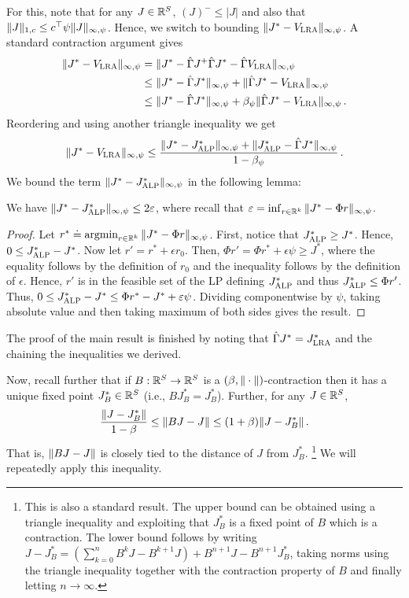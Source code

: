 \documentclass[twocolumn]{IEEEtran}
\begin{document}
For this, note that for any $J\in \mathbb{R}^S$,
$(J)^-\le |J|$
and also that $\|J\|_{1,c} \le c^\top \psi \| J \|_{\infty,\psi}$. Hence, we switch to bounding
$\|J^* - V_{\text{\sc LRA}} \|_{\infty,\psi}$.
A standard contraction argument gives
\begin{align*}
\|J^* - V_{\text{\sc LRA}} \|_{\infty,\psi}
& =   \| J^* - \hat{\Gamma} J^ + \hat{\Gamma} J^* -\hat{\Gamma} V_{\text{\sc LRA}} \|_{\infty,\psi} \\
& \le \| J^* - \hat{\Gamma} J^*\|_{\infty,\psi} + \|\hat{\Gamma} J^* - V_{\text{\sc LRA}} \|_{\infty,\psi} \\
& \le \| J^* - \hat{\Gamma} J^*\|_{\infty,\psi} + \beta_\psi \|\hat{\Gamma} J^* - V_{\text{\sc LRA}} \|_{\infty,\psi}\,.
\end{align*}
Reordering and using another triangle inequality we get
\begin{align*}
\|J^* - V_{\text{\sc LRA}} \|_{\infty,\psi} \le \frac{
\|J^* - J^*_{\text{\sc ALP}}\|_{\infty,\psi} + \| J^*_{\text{\sc ALP}} - \hat{\Gamma} J^* \|_{\infty,\psi}
}{1-\beta_\psi}\,.
\end{align*}
We bound the term $\|J^* - J^*_{\text{\sc ALP}}\|_{\infty,\psi}$ in the following lemma:
\begin{lemma}\label{bestbndmn}
We have
$ %
\norm{J^*-\Jalpo}_{\mn}\leq 2 \epsilon
$, %
where recall that $\varepsilon = \inf_{r\in \mathbb{R}^k} \| J^*-\Phi r \|_{\infty,\psi}$.
\end{lemma}
\begin{proof}
Let $r^*\doteq \operatorname{argmin}_{r\in \mathbb{R}^k} \| J^*-\Phi r \|_{\infty,\psi}$.
First, notice that $J^*_{\text{\sc ALP}} \ge J^*$.
Hence, $0\le J^*_{\text{\sc ALP}} - J^*$.
Now let $r' = r^* + \epsilon r_0$. Then,
$\Phi r' = \Phi r^* + \epsilon \psi \ge J^*$, where the equality follows by the definition of $r_0$ and
the inequality follows by the definition of $\epsilon$.
Hence, $r'$ is in the feasible set of the LP defining $J^*_{\text{\sc ALP}}$ and thus $J^*_{\text{\sc ALP}} \le \Phi r'$.
Thus, $0\le J^*_{\text{\sc ALP}} - J^* \le \Phi r^* - J^* + \varepsilon \psi$. Dividing componentwise by $\psi$,
taking absolute value and then taking maximum of both sides gives the result.
\end{proof}
The proof of the main result is finished by noting that $\hat{\Gamma} J^* = J^*_{\text{\sc LRA}}$ and the chaining the inequalities we derived.

Now, recall further that if $B:\mathbb{R}^S \to \mathbb{R}^S$ is a $(\beta,\|\cdot\|)$-contraction then it has a unique fixed point $J^*_B\in \mathbb{R}^S$ (i.e., $B J^*_B= J^*_B$). Further, for any $J\in \mathbb{R}^S$,
\begin{align}
\label{eq:csdw}
\frac{\norm{J-J^*_B}}{1-\beta} \le \norm{ BJ - J } \le (1+\beta) \norm{J-J^*_B}\,.
\end{align}
That is, $\|BJ-J\|$ is closely tied to the distance of $J$ from $J^*_B$.%
\footnote{This is also a standard result. The upper bound can be obtained using a triangle inequality and exploiting that $J^*_B$ is a fixed point of $B$ which is a contraction. The lower bound follows by writing $J - J^*_B = (\sum_{k=0}^n B^k J - B^{k+1} J ) + B^{n+1} J - B^{n+1} J^*_B$, taking norms using the triangle inequality together with the contraction property of $B$ and finally letting $n\to \infty$.}
We will repeatedly apply this inequality.
\end{document}
